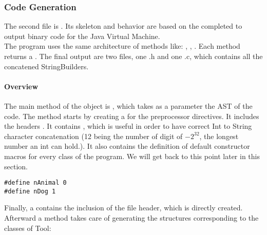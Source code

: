  \subsubsection{Code Generation}
The second file is . Its skeleton and behavior are based on the  completed
to output binary code for the Java Virtual Machine.\\
The program uses the same architecture of methods like: , , .
Each method returns a \lstset{style=customc}{\lstinline[basicstyle=\small\ttfamily]|StringBuilder|}.
\newline
The final output are two files, one .h and one .c, which contains all the concatened StringBuilders.
\newline
\paragraph{Overview}
The main method of the object
\newline
\lstset{style=customc}{\lstinline[basicstyle=\small\ttfamily]|COutputGeneration|} is
\lstset{style=customc}{\lstinline[basicstyle=\small\ttfamily]|def run(ctx: Context)(prog: Program)|}, which takes
as a parameter the AST of the code. %
\newline
The method starts by creating a \lstset{style=customc}{\lstinline[basicstyle=\small\ttfamily]|StringBuilder|} for the preprocessor directives.
It includes the headers \lstset{style=customc}{\lstinline[basicstyle=\small\ttfamily]|stdio.h, string.h and stdlib.h|}.
It contains \lstset{style=customc}{\lstinline[basicstyle=\small\ttfamily]|#define INT_MAX_LENGTH 12|}, which is useful
in order to have correct Int to String character concatenation (12 being the number of digit of $-2^{32}$, the longest number an int can hold.).
It also contains the definition of default constructor macros for every class of the program. We will get back to this point later in this section.
\begin{lstlisting}[caption={In the case of the example used in section 2, this would be the produced macros}, captionpos=b]
#define nAnimal 0
#define nDog 1
\end{lstlisting}
Finally, a \lstset{style=customc}{\lstinline[basicstyle=\small\ttfamily]|StringBuilder|} contains the inclusion of the file header,
which is directly created.
\newline
Afterward a method takes care of generating the structures corresponding to the classes of Tool:
